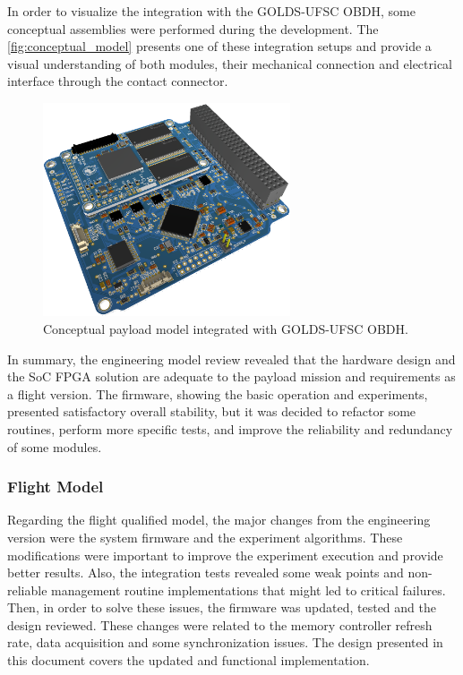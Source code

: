 In order to visualize the integration with the GOLDS-UFSC OBDH, some conceptual assemblies were performed during the development. The \autoref{fig:conceptual_model} presents one of these integration setups and provide a visual understanding of both modules, their mechanical connection and electrical interface through the contact connector.

\begin{figure}[!ht]
    \begin{center}
        \includegraphics[width=0.65\textwidth]{figures/conceptual_model.png}
        \caption{Conceptual payload model integrated with GOLDS-UFSC OBDH.}
        \label{fig:conceptual_model}
    \end{center}
\end{figure}

In summary, the engineering model review revealed that the hardware design and the SoC FPGA solution are adequate to the payload mission and requirements as a flight version. The firmware, showing the basic operation and experiments, presented satisfactory overall stability, but it was decided to refactor some routines, perform more specific tests, and improve the reliability and redundancy of some modules.   


\subsubsection{Flight Model}

Regarding the flight qualified model, the major changes from the engineering version were the system firmware and the experiment algorithms. These modifications were important to improve the experiment execution and provide better results. Also, the integration tests revealed some weak points and non-reliable management routine implementations that might led to critical failures. Then, in order to solve these issues, the firmware was updated, tested and the design reviewed. These changes were related to the memory controller refresh rate, data acquisition and some synchronization issues. The design presented in this document covers the updated and functional implementation.

